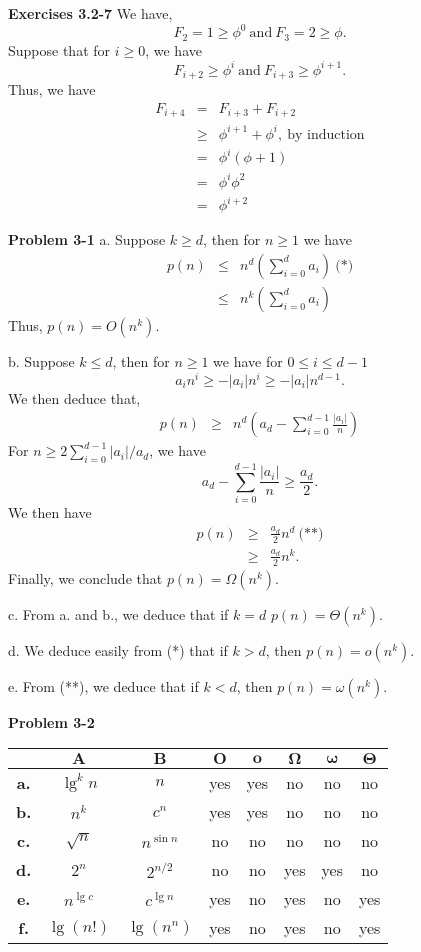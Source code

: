 \documentclass[a4paper,12pt]{article}
\newcommand{\newpar}[1]
{\bigskip \noindent \textbf{Exercises #1} \newline}
\newcommand{\newprob}[1]
{\bigskip \noindent \textbf{Problem #1} \newline}
\begin{document}
\newpar{3.2-7}
We have,
\[ F_2 = 1 \ge \phi^0\ \mbox{and}\ F_3 = 2 \ge \phi.\]
Suppose that for $i \ge 0$, we have
\[ F_{i+2} \ge \phi^i\ \mbox{and}\ F_{i+3} \ge \phi^{i+1}.\]
Thus, we have
\begin{eqnarray*}
F_{i+4} &=& F_{i+3} + F_{i+2} \\
&\ge& \phi^{i+1} + \phi^i,\ \mbox{by induction} \\
&=& \phi^i(\phi+1) \\
&=& \phi^i\phi^2\\
&=& \phi^{i+2}
\end{eqnarray*}

\newprob{3-1}
a. Suppose $k \ge d$, then for $n \ge 1$ we have
\begin{eqnarray*}
p(n) &\le& n^d\left(\sum_{i=0}^da_i\right)\ \mbox{(*)}\\
&\le& n^k \left(\sum_{i=0}^da_i\right)
\end{eqnarray*}
Thus, $p(n) = O(n^k)$.

\medskip \noindent b. Suppose $k \le d$, then for $n \ge 1$ we have
for $0 \le i \le d-1$
\[ a_i n^i \ge - |a_i| n^i \ge -|a_i| n^{d-1}.\]
We then deduce that,
\begin{eqnarray*}
p(n) &\ge& n^d\left(a_d - \sum_{i=0}^{d-1} \frac{|a_i|}{n}\right)
\end{eqnarray*}
For $n \ge 2 \sum_{i=0}^{d-1}|a_i|/a_d$, we have
\[a_d - \sum_{i=0}^{d-1} \frac{|a_i|}{n} \ge \frac{a_d}{2}.\]
We then have
\begin{eqnarray*}
p(n) &\ge& \frac{a_d}{2} n^d\ \mbox{(**)}\\ 
&\ge& \frac{a_d}{2} n^k.
\end{eqnarray*}
Finally, we conclude that $p(n) = \Omega(n^k)$.

\medskip \noindent
c. From a. and b., we deduce that if $k=d$ $p(n) = \Theta(n^k)$.

\medskip \noindent
d. We deduce easily from (*) that if $k > d$, then $p(n) = o(n^k)$.

\medskip \noindent
e. From (**), we deduce that if $k < d$, then $p(n) = \omega(n^k)$.

\newprob{3-2}
\begin{tabular}{|c|c|c|c|c|c|c|c|}
\hline
&$\mathbf{A}$&$\mathbf{B}$&$\mathbf{O}$&$\mathbf{o}$&
$\mathbf{\Omega}$&$\mathbf{\omega}$&$\mathbf{\Theta}$\\ 
\hline
\textbf{a.}&$\lg^kn$&$n$&yes&yes&no&no&no\\ 
\hline
\textbf{b.}&$n^k$&$c^n$&yes&yes&no&no&no\\
\hline
\textbf{c.}&$\sqrt{n}$&$n^{\sin n}$&no&no&no&no&no\\
\hline
\textbf{d.}&$2^n$&$2^{n/2}$&no&no&yes&yes&no\\
\hline
\textbf{e.}&$n^{\lg c}$&$c^{\lg n}$&yes&no&yes&no&yes\\
\hline
\textbf{f.}&$\lg(n!)$&$\lg(n^n)$&yes&no&yes&no&yes\\
\hline
\end{tabular}
\end{document}
